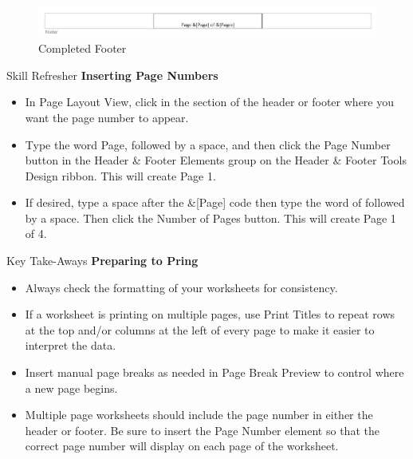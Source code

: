 \begin{figure}[H]
	\centering
	\includegraphics[width=\maxwidth{.95\linewidth}]{gfx/ch03_fig33}
	\caption{Completed Footer}
	\label{03:fig33}
\end{figure}



\begin{center}
	\begin{sklbox}{Skill Refresher}
		\textbf{Inserting Page Numbers}
		\\
		\begin{itemize}
			\setlength{\itemsep}{0pt}
			\setlength{\parskip}{0pt}
			\setlength{\parsep}{0pt}

			\item In Page Layout View, click in the section of the header or footer where you want the page number to appear.
			\item Type the word Page, followed by a space, and then click the Page Number button in the Header \& Footer Elements group on the Header \& Footer Tools Design ribbon. This will create Page 1.
			\item If desired, type a space after the \&[Page] code then type the word of followed by a space. Then click the Number of Pages button. This will create Page 1 of 4.
			
		\end{itemize}
	\end{sklbox}
\end{center}


\begin{center}
	\begin{tkwbox}{Key Take-Aways}
		\textbf{Preparing to Pring}
		\\
		\begin{itemize}
			\setlength{\itemsep}{0pt}
			\setlength{\parskip}{0pt}
			\setlength{\parsep}{0pt}

			\item Always check the formatting of your worksheets for consistency.
			\item If a worksheet is printing on multiple pages, use Print Titles to repeat rows at the top and/or columns at the left of every page to make it easier to interpret the data.
			\item Insert manual page breaks as needed in Page Break Preview to control where a new page begins.
			\item Multiple page worksheets should include the page number in either the header or footer. Be sure to insert the Page Number element so that the correct page number will display on each page of the worksheet.
			
		\end{itemize}
	\end{tkwbox}
\end{center}


